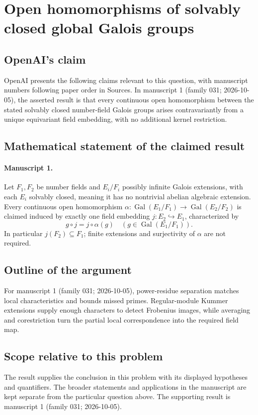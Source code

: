 \documentclass[11pt]{article}
\begin{document}
\section*{Open homomorphisms of solvably closed global Galois groups}

\subsection{OpenAI's claim}
OpenAI presents the following claims relevant to this question, with manuscript numbers following paper order in Sources. In manuscript 1 (family 031; 2026-10-05), the asserted result is that every continuous open homomorphism between the stated solvably closed number-field Galois groups arises contravariantly from a unique equivariant field embedding, with no additional kernel restriction.

\subsection{Mathematical statement of the claimed result}
\paragraph{Manuscript 1.}
Let $F_1,F_2$ be number fields and $E_i/F_i$ possibly infinite Galois extensions, with each $E_i$ solvably closed, meaning it has no nontrivial abelian algebraic extension. Every continuous open homomorphism $\alpha:\operatorname{Gal}(E_1/F_1)\to\operatorname{Gal}(E_2/F_2)$ is claimed induced by exactly one field embedding $j:E_2\hookrightarrow E_1$, characterized by
\[
 g\circ j=j\circ\alpha(g)\quad(g\in\operatorname{Gal}(E_1/F_1)).
\]
In particular $j(F_2)\subseteq F_1$; finite extensions and surjectivity of $\alpha$ are not required.

\subsection{Outline of the argument}
For manuscript 1 (family 031; 2026-10-05), power-residue separation matches local characteristics and bounds missed primes. Regular-module Kummer extensions supply enough characters to detect Frobenius images, while averaging and corestriction turn the partial local correspondence into the required field map.

\subsection{Scope relative to this problem}
The result supplies the conclusion in this problem with its displayed hypotheses and quantifiers. The broader statements and applications in the manuscript are kept separate from the particular question above. The supporting result is manuscript 1 (family 031; 2026-10-05).
\end{document}
